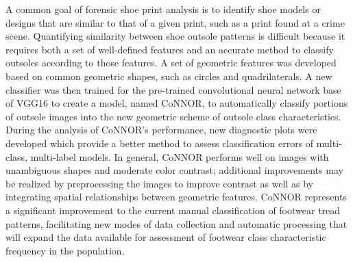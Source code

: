 
A common goal of forensic shoe print analysis is to identify shoe models or designs that are similar to that of a given print, such as a print found at a crime scene. Quantifying similarity between shoe outsole patterns is difficult because it requires both a set of well-defined features and an accurate method to classify outsoles according to those features. A set of geometric features was developed based on common geometric shapes, such as circles and quadrilaterals. A new classifier was then trained for the pre-trained convolutional neural network base of VGG16 to create a model, named CoNNOR, to automatically classify portions of outsole images into the new geometric scheme of outsole class characteristics. During the analysis of CoNNOR's performance, new diagnostic plots were developed which provide a better method to assess classification errors of multi-class, multi-label models. In general, CoNNOR performs well on images with unambiguous shapes and moderate color contrast; additional improvements may be realized by preprocessing the images to improve contrast as well as by integrating spatial relationships between geometric features. CoNNOR represents a significant improvement to the current manual classification of footwear tread patterns, facilitating new modes of data collection and automatic processing that will expand the data available for assessment of footwear class characteristic frequency in the population.
